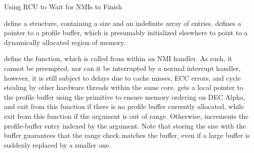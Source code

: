 \begin{listing}
\begin{fcvlabel}
\end{fcvlabel}
\caption{Using RCU to Wait for NMIs to Finish}
\label{lst:defer:Using RCU to Wait for NMIs to Finish}
\end{listing}

\begin{fcvref}
 define a  structure, containing a
size and an indefinite array of entries.
 defines a pointer to a profile buffer, which is
presumably initialized elsewhere to point to a dynamically allocated
region of memory.
\end{fcvref}

\begin{fcvref}
 define the  function,
which is called from within an NMI handler.
As such, it cannot be preempted, nor can it be interrupted by a normal
interrupt handler, however, it is still subject to delays due to cache misses,
ECC errors, and cycle stealing by other hardware threads within the same
core.
 gets a local pointer to the profile buffer using the
 primitive to ensure memory ordering on
DEC Alpha, and
 exit from this function if there is no
profile buffer currently allocated, while 
exit from this function if the  argument
is out of range.
Otherwise,  increments the profile-buffer entry indexed
by the  argument.
Note that storing the size with the buffer guarantees that the
range check matches the buffer, even if a large buffer is suddenly
replaced by a smaller one.
\end{fcvref}

